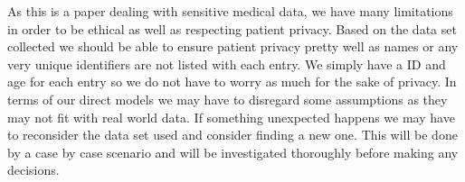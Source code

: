 \documentclass[12pt]{article}
\begin{document}
As this is a paper dealing with sensitive medical data, we have many limitations in order to be ethical as well as respecting patient 
privacy. Based on the data set collected we should be able to ensure patient privacy pretty well as names or any very unique identifiers 
are not listed with each entry. We simply have a ID and age for each entry so we do not have to worry as much for the sake of privacy. In 
terms of our direct models we may have to disregard some assumptions as they may not fit with real world data. If something unexpected 
happens we may have to reconsider the data set used and consider finding a new one. This will be done by a case by case scenario and will 
be investigated thoroughly before making any decisions.



\end{document}
